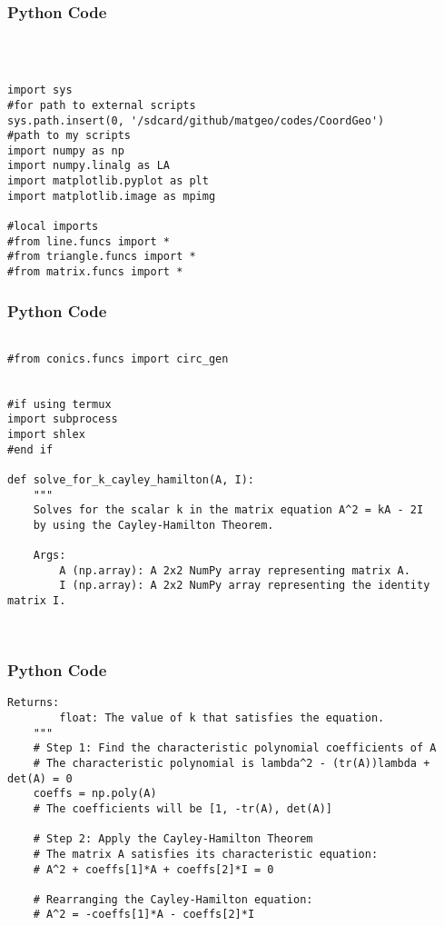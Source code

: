 \documentclass{beamer}
\begin{document}
\begin{frame}[fragile]
    \frametitle{Python Code }
    \begin{lstlisting}



import sys
#for path to external scripts
sys.path.insert(0, '/sdcard/github/matgeo/codes/CoordGeo')
#path to my scripts
import numpy as np
import numpy.linalg as LA
import matplotlib.pyplot as plt
import matplotlib.image as mpimg

#local imports
#from line.funcs import *
#from triangle.funcs import *
#from matrix.funcs import *

    \end{lstlisting}
\end{frame}

\begin{frame}[fragile]
    \frametitle{Python Code }
    \begin{lstlisting}

#from conics.funcs import circ_gen


#if using termux
import subprocess
import shlex
#end if

def solve_for_k_cayley_hamilton(A, I):
    """
    Solves for the scalar k in the matrix equation A^2 = kA - 2I
    by using the Cayley-Hamilton Theorem.

    Args:
        A (np.array): A 2x2 NumPy array representing matrix A.
        I (np.array): A 2x2 NumPy array representing the identity matrix I.

    
    \end{lstlisting}
\end{frame}

\begin{frame}[fragile]
    \frametitle{Python Code }
    \begin{lstlisting}
Returns:
        float: The value of k that satisfies the equation.
    """
    # Step 1: Find the characteristic polynomial coefficients of A
    # The characteristic polynomial is lambda^2 - (tr(A))lambda + det(A) = 0
    coeffs = np.poly(A)
    # The coefficients will be [1, -tr(A), det(A)]

    # Step 2: Apply the Cayley-Hamilton Theorem
    # The matrix A satisfies its characteristic equation:
    # A^2 + coeffs[1]*A + coeffs[2]*I = 0
    
    # Rearranging the Cayley-Hamilton equation:
    # A^2 = -coeffs[1]*A - coeffs[2]*I

    
    \end{lstlisting}
\end{frame}
\end{document}
